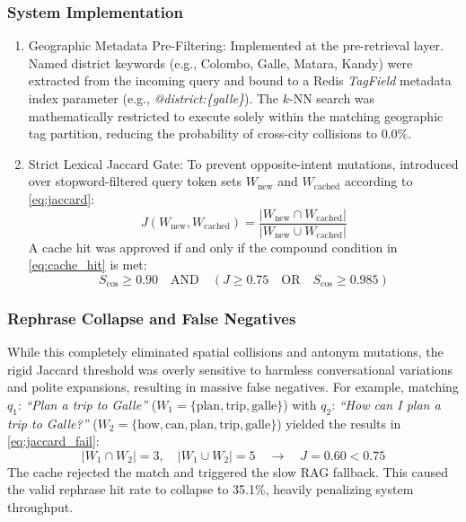 \documentclass{ieeeaccess}
\begin{document}
\subsubsection{System Implementation}
\begin{enumerate}
    \item{Geographic Metadata Pre-Filtering}: Implemented at the pre-retrieval layer. Named district keywords (e.g., Colombo, Galle, Matara, Kandy) were extracted from the incoming query and bound to a Redis \emph{TagField} metadata index parameter (e.g., \emph{@district:\{galle\}}). The $k$-NN search was mathematically restricted to execute solely within the matching geographic tag partition, reducing the probability of cross-city collisions to $0.0\%$.
    \item{Strict Lexical Jaccard Gate}: To prevent opposite-intent mutations, introduced over stopword-filtered query token sets $W_{\text{new}}$ and $W_{\text{cached}}$ according to \eqref{eq:jaccard}:
    \begin{equation}
\label{eq:jaccard}
        J(W_{\text{new}}, W_{\text{cached}}) = \frac{|W_{\text{new}} \cap W_{\text{cached}}|}{|W_{\text{new}} \cup W_{\text{cached}}|}
    \end{equation}
    A cache hit was approved if and only if the compound condition in \eqref{eq:cache_hit} is met:
    \begin{equation}
\label{eq:cache_hit}
        S_{\text{cos}} \ge 0.90 \quad \text{AND} \quad \left( J \ge 0.75 \quad \text{OR} \quad S_{\text{cos}} \ge 0.985 \right)
    \end{equation}
\end{enumerate}

\subsubsection{Rephrase Collapse and False Negatives}
While this completely eliminated spatial collisions and antonym mutations, the rigid Jaccard threshold was overly sensitive to harmless conversational variations and polite expansions, resulting in massive false negatives. For example, matching $q_1$: \emph{``Plan a trip to Galle''} ($W_1 = \{\text{plan}, \text{trip}, \text{galle}\}$) with $q_2$: \emph{``How can I plan a trip to Galle?''} ($W_2 = \{\text{how}, \text{can}, \text{plan}, \text{trip}, \text{galle}\}$) yielded the results in \eqref{eq:jaccard_fail}:
\begin{equation}
\label{eq:jaccard_fail}
    |W_1 \cap W_2| = 3, \quad |W_1 \cup W_2| = 5 \quad \rightarrow \quad J = 0.60 < 0.75
\end{equation}
The cache rejected the match and triggered the slow RAG fallback. This caused the valid rephrase hit rate to collapse to {35.1\%}, heavily penalizing system throughput.
\end{document}
